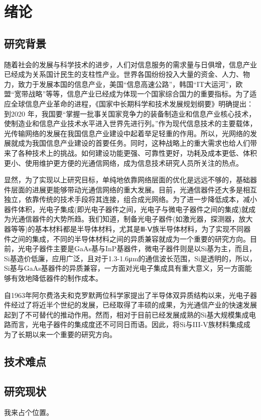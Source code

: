 % 

\chapter{绪论}

\section{研究背景}


随着社会的发展与科学技术的进步，人们对信息服务的需求量与日俱增，信息产业已经成为关系国计民生的支柱性产业。世界各国纷纷投入大量的资金、人力、物力，致力于发展本国的信息产业，美国“信息高速公路”，韩国“IT大运河”，欧盟“宽带战略”等等，信息产业已经成为体现一个国家综合国力的重要指标。为了适应全球信息产业革命的进程，《国家中长期科学和技术发展规划纲要》明确提出：到2020 年，我国要“掌握一批事关国家竞争力的装备制造业和信息产业核心技术，使制造业和信息产业技术水平进入世界先进行列。”作为现代信息技术的主要载体，光传输网络的发展在我国信息产业建设中起着举足轻重的作用。所以，光网络的发展就成为我国信息产业建设的首要任务。同时，这种战略上的重大需求也给人们带来了各种技术上的挑战。如何建设功能更强、可靠性更好，功耗及成本更低、体积更小、使用维护更方便的光通信网络，成为信息技术研究人员所关注的热点。

显然，为了实现以上研究目标，单纯地依靠网络层面的优化是远远不够的，基础器件层面的进展更能够带动光通信网络的重大发展。目前，光通信器件还大多是相互独立，依靠传统的技术手段将其连接，组合成光网络。为了进一步降低成本，减小器件体积，光电子集成(即光电子器件之间，光电子与微电子器件之间的集成)就成为光通信器件的大势所趋。我们知道，制备光电子器件(如激光器，探测器，放大器等等)的基本材料都是半导体材料，尤其是Ⅲ-Ⅴ族半导体材料，为了实现不同器件之间的集成，不同的半导体材料之间的异质兼容就成为一个重要的研究方向。目前，光电子器件主要是GaAs基与InP基器件，微电子器件则是以Si基为主，而且，Si基造价低廉，应用广泛，且对于1.3-1.6μm的通信波长范围，Si是透明的，所以， Si基与GaAs基器件的异质兼容，一方面对光电子集成具有重大意义，另一方面能够有效地降低器件的制作成本。

自1963年阿尔费洛夫和克罗默两位科学家提出了半导体双异质结构以来，光电子器件经过了将近半个世纪的发展，已经取得了丰硕的成果，为光通信产业的快速发展起到了不可替代的推动作用。然而，相对于目前已经发展成熟的Si基大规模集成电路而言，光电子器件的集成度还不可同日而语。因此，将Si与III-V族材料集成成为了长期以来一个重要的研究方向。


\section{技术难点}

\section{研究现状}
我来占个位置。\cite{BUPT_Thesis_Format_2004}


\ifx\usechapbib\empty


\fi

